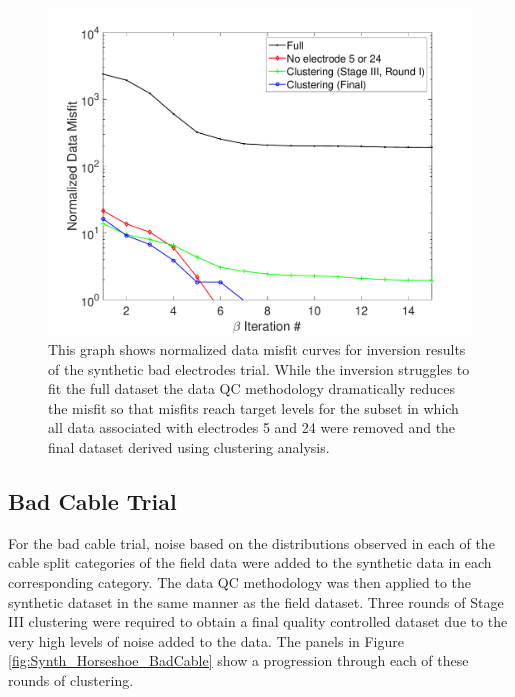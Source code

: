 \documentclass[final,authoryear,5p,times,twocolumn]{elsarticle}
\begin{document}
\begin{figure} [!ht]
	\begin{center}
	\includegraphics[trim=1.3cm 0.2cm 2.6cm 1.2cm, clip=true,width=0.75\linewidth]{./Figures/Fig22.pdf}
	\end{center}
\caption{This graph shows normalized data misfit curves for inversion results of the synthetic bad electrodes trial. While the inversion struggles to fit the full dataset the data QC methodology dramatically reduces the misfit so that misfits reach target levels for the subset in which all data associated with electrodes 5 and 24 were removed and the final dataset derived using clustering analysis.}
\label{fig:Synth_Horseshoe_BadElec_MisfitPlots}
\end{figure}

\subsection{Bad Cable Trial}

For the bad cable trial, noise based on the distributions observed in each of the cable split categories of the field data were added to the synthetic data in each corresponding category. The data QC methodology was then applied to the synthetic dataset in the same manner as the field dataset. Three rounds of Stage III clustering were required to obtain a final quality controlled dataset due to the very high levels of noise added to the data. The panels in Figure \ref{fig:Synth_Horseshoe_BadCable} show a progression through each of these rounds of clustering. 
\end{document}
